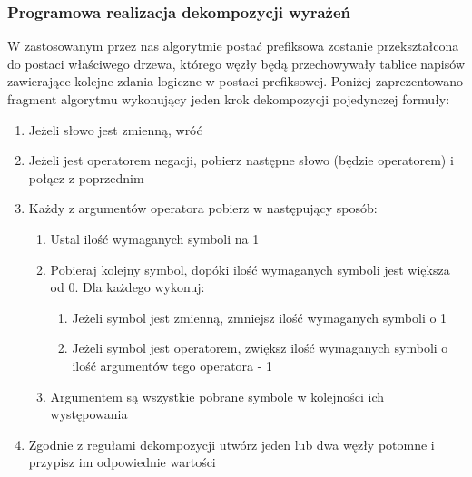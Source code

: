 \documentclass[12pt,a4paper,titlepage]{article}
\begin{document}
\subsubsection{Programowa realizacja dekompozycji wyrażeń}
W zastosowanym przez nas algorytmie postać prefiksowa zostanie przekształcona do postaci właściwego drzewa, którego węzły będą przechowywały tablice napisów zawierające kolejne zdania logiczne w postaci prefiksowej. Poniżej zaprezentowano fragment algorytmu wykonujący jeden krok dekompozycji pojedynczej formuły:
\begin{enumerate}
	\item Jeżeli słowo jest zmienną, wróć
	\item Jeżeli jest operatorem negacji, pobierz następne słowo (będzie operatorem) i połącz z poprzednim
	\item Każdy z argumentów operatora pobierz w następujący sposób:
	\begin{enumerate}
		\item Ustal ilość wymaganych symboli na 1
		\item Pobieraj kolejny symbol, dopóki ilość wymaganych symboli jest większa od 0. Dla każdego wykonuj:
		\begin{enumerate}
			\item Jeżeli symbol jest zmienną, zmniejsz ilość wymaganych symboli o 1
			\item Jeżeli symbol jest operatorem, zwiększ ilość wymaganych symboli o ilość argumentów tego operatora - 1
		\end{enumerate}
		\item Argumentem są wszystkie pobrane symbole w kolejności ich występowania
	\end{enumerate}
	\item Zgodnie z regułami dekompozycji utwórz jeden lub dwa węzły potomne i przypisz im odpowiednie wartości
\end{enumerate}
\end{document}
